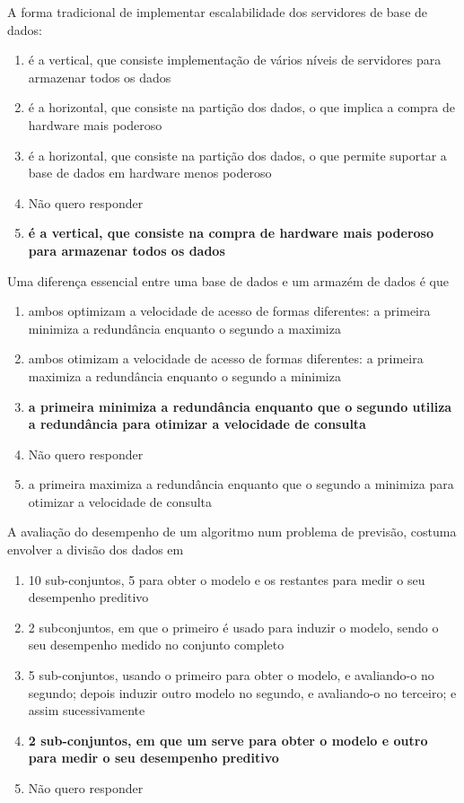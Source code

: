 \documentclass[type=normal, year=2015/16]{bdad_exam}
\begin{document}
{
A forma tradicional de implementar escalabilidade dos servidores de base de dados:
\begin{enumerate}[label=\alph*.]\itemsep0em
    \item é a vertical, que consiste implementação de vários níveis de servidores para armazenar todos os dados
    \item é a horizontal, que consiste na partição dos dados, o que implica a compra de hardware mais poderoso
    \item é a horizontal, que consiste na partição dos dados, o que permite suportar a base de dados em hardware menos poderoso
    \item Não quero responder
    \item \textbf{é a vertical, que consiste na compra de hardware mais poderoso para armazenar todos os dados \greencheckmark}
\end{enumerate}

Uma diferença essencial entre uma base de dados e um armazém de dados é que
\begin{enumerate}[label=\alph*.]\itemsep0em
    \item ambos optimizam a velocidade de acesso de formas diferentes: a primeira minimiza a redundância enquanto o segundo a maximiza
    \item ambos otimizam a velocidade de acesso de formas diferentes: a primeira maximiza a redundância enquanto o segundo a minimiza
    \item \textbf{a primeira minimiza a redundância enquanto que o segundo utiliza a redundância para otimizar a velocidade de consulta \greencheckmark}
    \item Não quero responder
    \item a primeira maximiza a redundância enquanto que o segundo a minimiza para otimizar a velocidade de consulta
\end{enumerate}

A avaliação do desempenho de um algoritmo num problema de previsão, costuma envolver a divisão dos dados em
\begin{enumerate}[label=\alph*.]\itemsep0em
    \item 10 sub-conjuntos, 5 para obter o modelo e os restantes para medir o seu desempenho preditivo
    \item 2 subconjuntos, em que o primeiro é usado para induzir o modelo, sendo o seu desempenho medido no conjunto completo
    \item 5 sub-conjuntos, usando o primeiro para obter o modelo, e avaliando-o no segundo; depois induzir outro modelo no segundo, e avaliando-o no terceiro; e assim sucessivamente
    \item \textbf{2 sub-conjuntos, em que um serve para obter o modelo e outro para medir o seu desempenho preditivo \greencheckmark}
    \item Não quero responder
\end{enumerate}

}
\end{document}
